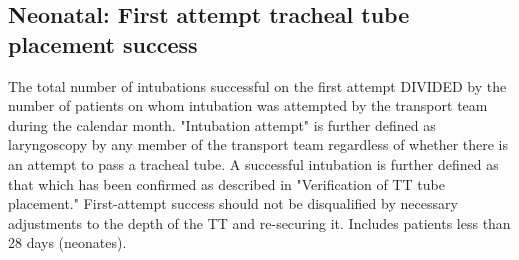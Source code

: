 \documentclass[twoside]{article}\usepackage[]{graphicx}\usepackage[]{color}
\makeatletter
\newenvironment{kframe}{%
 \def\at@end@of@kframe{}%
 \ifinner\ifhmode%
  \def\at@end@of@kframe{\end{minipage}}%
  \begin{minipage}{\columnwidth}%
 \fi\fi%
 \def\FrameCommand##1{\hskip\@totalleftmargin \hskip-\fboxsep
 \colorbox{shadecolor}{##1}\hskip-\fboxsep
     \hskip-\linewidth \hskip-\@totalleftmargin \hskip\columnwidth}%
 \MakeFramed {\advance\hsize-\width
   \@totalleftmargin\z@ \linewidth\hsize
   \@setminipage}}%
 {\par\unskip\endMakeFramed%
 \at@end@of@kframe}
\newenvironment{knitrout}{}{} %
\makeatother
\begin{document}
\begin{center}
\begin{knitrout}
\color{fgcolor}\begin{kframe}


{\ttfamily\noindent\bfseries\color{errorcolor}{\#\# Error: elements of 'n' must be positive}}\end{kframe}
\end{knitrout}
\end{center}

\begin{kframe}


{\ttfamily\noindent\bfseries{}}\end{kframe}

\newpage
\subsection{Neonatal: First attempt tracheal tube placement success}
The total number of intubations successful on the first attempt DIVIDED by the number of patients on whom intubation was attempted by the transport team during the calendar month. "Intubation attempt" is further defined as laryngoscopy by any member of the transport team regardless of whether there is an attempt to pass a tracheal tube. A successful intubation is further defined as that which has been confirmed as described in "Verification of TT tube placement." First-attempt success should not be disqualified by necessary adjustments to the depth of the TT and re-securing it. Includes patients less than 28 days (neonates).

\begin{center}
\begin{knitrout}
\color{fgcolor}\begin{kframe}


{\ttfamily\noindent\bfseries\color{errorcolor}{\#\# Error: only defined on a data frame with all numeric variables}}\end{kframe}
\end{knitrout}
\end{center}

\begin{kframe}


{\ttfamily\noindent\bfseries{}}\end{kframe}
\end{document}
